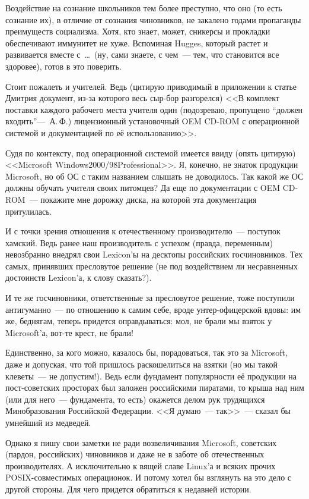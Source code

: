 Воздействие на сознание школьников тем более преступно, что оно (то есть сознание их), в отличие от сознания чиновников, не закалено годами пропаганды преимуществ социализма. Хотя, кто знает, может, сникерсы и прокладки обеспечивают иммунитет не хуже. Вспоминая Hugges, который растет и развивается вместе с~\dots~(ну, сами знаете, с чем~--- тем, что становится все здоровее), готов в это поверить.

Стоит пожалеть и учителей. Ведь (цитирую приводимый в приложении к статье Дмитрия документ, из-за которого весь сыр-бор разгорелся) <<В комплект поставки каждого рабочего места учителя один (подозреваю, пропущено ``должен входить''---~А.\,Ф.) лицензионный установочный OEM CD-ROM с операционной системой и документацией по её использованию>>.

Судя по контексту, под операционной системой имеется ввиду (опять цитирую) <<Microsoft Windows2000/98Professional>>. Я, конечно, не знаток продукции Microsoft, но об ОС с таким названием слышать не доводилось. Так какой же ОС должны обучать учителя своих питомцев? Да еще по документации с OEM CD-ROM~--- покажите мне дорожку диска, на которой эта документация притулилась.

И с точки зрения отношения к отечественному производителю~--- поступок хамский. Ведь ранее наш производитель с успехом (правда, переменным) невозбранно внедрял свои Lexicon'ы на десктопы российских госчиновников. Тех самых, принявших пресловутое решение (не под воздействием ли несравненных достоинств Lexicon'а, к слову сказать?).

И те же госчиновники, ответственные за пресловутое решение, тоже поступили антигуманно~--- по отношению к самим себе, вроде унтер-офицерской вдовы: им же, беднягам, теперь придется оправдываться: мол, не брали мы взяток у Microsoft'а, вот-те крест, не брали!

Единственно, за кого можно, казалось бы, порадоваться, так это за Microsoft, даже и допуская, что той пришлось раскошелиться на взятки (но мы такой клеветы~--- не допустим!). Ведь если фундамент популярности её продукции на пост-советских просторах был заложен российскими пиратами, то крыша над ним (или для него~--- фундамента, то есть) окажется делом рук трудящихся Минобразования Российской Федерации. <<Я думаю~--- так>>~--- сказал бы умнейший из медведей.

Однако я пишу свои заметки не ради возвеличивания Microsoft, советских (пардон, российских) чиновников и даже не в заботе об отечественных производителях. А исключительно к вящей славе Linux'а и всяких прочих POSIX-совместимых операционок. И потому хотел бы взглянуть на это дело с другой стороны. Для чего придется обратиться к недавней истории.

